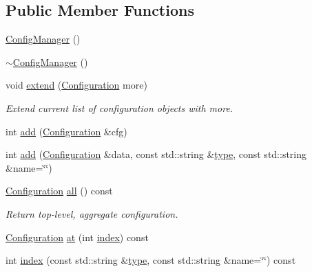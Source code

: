 \subsection*{Public Member Functions}
\begin{DoxyCompactItemize}
\item 
\hyperlink{class_wire_cell_1_1_config_manager_a7d3d7c10423d969f7544509f6fcca32f}{Config\+Manager} ()
\item 
\hyperlink{class_wire_cell_1_1_config_manager_a7fa65fdff98bdd5bbbf72196bd9ccf17}{$\sim$\+Config\+Manager} ()
\item 
void \hyperlink{class_wire_cell_1_1_config_manager_abd465f55ebf6135f5e24b5074020fa36}{extend} (\hyperlink{namespace_wire_cell_a9f705541fc1d46c608b3d32c182333ee}{Configuration} more)
\begin{DoxyCompactList}\small\item\em Extend current list of configuration objects with more. \end{DoxyCompactList}\item 
int \hyperlink{class_wire_cell_1_1_config_manager_a7e1e1b91cdecd2c5464d2b8bf422d329}{add} (\hyperlink{namespace_wire_cell_a9f705541fc1d46c608b3d32c182333ee}{Configuration} \&cfg)
\item 
int \hyperlink{class_wire_cell_1_1_config_manager_a8c96b5d7ab755d24a7dc9d9c2ea6cf4b}{add} (\hyperlink{namespace_wire_cell_a9f705541fc1d46c608b3d32c182333ee}{Configuration} \&data, const std\+::string \&\hyperlink{namespace_wire_cell_a1f69a2598e2cdb413ffac1157b50670a}{type}, const std\+::string \&name=\char`\"{}\char`\"{})
\item 
\hyperlink{namespace_wire_cell_a9f705541fc1d46c608b3d32c182333ee}{Configuration} \hyperlink{class_wire_cell_1_1_config_manager_a51fb922bec307a48b4e7424d5d417955}{all} () const
\begin{DoxyCompactList}\small\item\em Return top-\/level, aggregate configuration. \end{DoxyCompactList}\item 
\hyperlink{namespace_wire_cell_a9f705541fc1d46c608b3d32c182333ee}{Configuration} \hyperlink{class_wire_cell_1_1_config_manager_a598ade80af4432ce25beac1d2ba3028e}{at} (int \hyperlink{class_wire_cell_1_1_config_manager_aca683be02b131cdab4a1a54aeb635206}{index}) const
\item 
int \hyperlink{class_wire_cell_1_1_config_manager_aca683be02b131cdab4a1a54aeb635206}{index} (const std\+::string \&\hyperlink{namespace_wire_cell_a1f69a2598e2cdb413ffac1157b50670a}{type}, const std\+::string \&name=\char`\"{}\char`\"{}) const

\end{DoxyCompactItemize}
